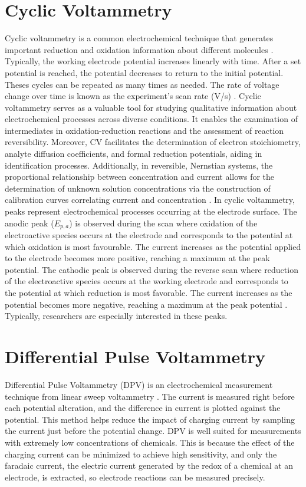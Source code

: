 \section{Cyclic Voltammetry}

Cyclic voltammetry is a common electrochemical technique that generates important reduction and oxidation information about different molecules \cite{doi:10.1021/ac60210a007}. Typically, the working electrode potential increases linearly with time. After a set potential is reached, the potential decreases to return to the initial potential. Theses cycles can be repeated as many times as needed. The rate of voltage change over time is known as the experiment's scan rate (V/s) \cite{https://doi.org/10.1002/anie.198408313}. Cyclic voltammetry serves as a valuable tool for studying qualitative information about electrochemical processes across diverse conditions. It enables the examination of intermediates in oxidation-reduction reactions and the assessment of reaction reversibility. Moreover, CV facilitates the determination of electron stoichiometry, analyte diffusion coefficients, and formal reduction potentials, aiding in identification processes. Additionally, in reversible, Nernstian systems, the proportional relationship between concentration and current allows for the determination of unknown solution concentrations via the construction of calibration curves correlating current and concentration \cite{Libretexts_2023}.
In cyclic voltammetry, peaks represent electrochemical processes occurring at the electrode surface. The anodic peak ($E_{p, a}$) is observed during the scan where oxidation of the electroactive species occurs at the electrode and corresponds to the potential at which oxidation is most favourable. The current increases as the potential applied to the electrode becomes more positive, reaching a maximum at the peak potential. The cathodic peak is observed during the reverse scan where reduction of the electroactive species occurs at the working electrode and corresponds to the potential at which reduction is most favorable. The current increases as the potential becomes more negative, reaching a maximum at the peak potential \cite{GRIMSHAW20001}. Typically, researchers are especially interested in these peaks.
\section{Differential Pulse Voltammetry}
Differential Pulse Voltammetry (DPV) is an electrochemical measurement technique from linear sweep voltammetry \cite{Scholz2005-pa}. The current is measured right before each potential alteration, and the difference in current is plotted against the potential. This method helps reduce the impact of charging current by sampling the current just before the potential change. DPV is well suited for measurements with extremely low concentrations of chemicals. This is because the effect of the charging current can be minimized to achieve high sensitivity, and only the faradaic current, the electric current generated by the redox of a chemical at an electrode, is extracted, so electrode reactions can be measured precisely. 


